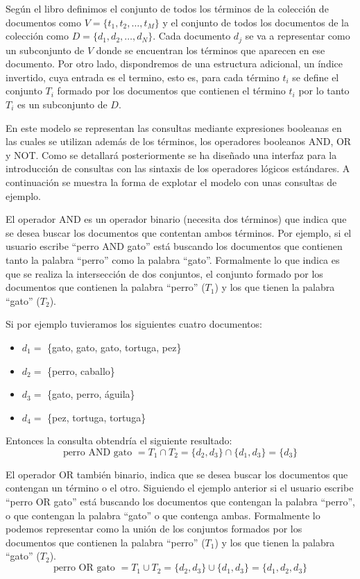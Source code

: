 \documentclass[size=a4, parskip=half, titlepage=false, toc=flat, toc=bib, 12pt, twoside]{scrartcl}
\theoremstyle{theorem-style}
\theoremstyle{definition-style}
\theoremstyle{remark-style}
\theoremstyle{example-style}
\theoremstyle{definition-style}
\theoremstyle{remark-style}
\begin{document}
Según el libro \cite{ri} definimos el conjunto de todos los términos de la colección de documentos como $V = \{t_1, t_2, \dots, t_M \}$ y el conjunto de todos los documentos de la colección como $D = \{ d_1, d_2, \dots, d_N \}$. Cada documento $d_j$ se va a representar como un subconjunto de $V$ donde se encuentran los términos que aparecen en ese documento. Por otro lado, dispondremos de una estructura adicional, un índice invertido, cuya entrada es el termino, esto es, para cada término $t_i$ se define el conjunto $T_i$ formado por los documentos que contienen el término $t_i$ por lo tanto $T_i$ es un subconjunto de $D$.

En este modelo se representan las consultas mediante expresiones booleanas en las cuales se utilizan además de los términos, los operadores booleanos AND, OR y NOT. Como se detallará posteriormente se ha diseñado una interfaz para la introducción de consultas con las sintaxis de los operadores lógicos estándares. A continuación se muestra la forma de explotar el modelo con unas consultas de ejemplo.

El operador AND es un operador binario (necesita dos términos) que indica que se desea buscar los documentos que contentan ambos términos. Por ejemplo, si el usuario escribe ``perro AND gato'' está buscando los documentos que contienen tanto la palabra ``perro'' como la palabra ``gato''. Formalmente lo que indica es que se realiza la intersección de dos conjuntos, el conjunto formado por los documentos que contienen la palabra ``perro'' ($T_1$) y los que tienen la palabra ``gato'' ($T_2$).

Si por ejemplo tuvieramos los siguientes cuatro documentos:
\begin{itemize}
\item $d_1 = $ \{gato, gato, gato, tortuga, pez\}
\item $d_2 = $ \{perro, caballo\}
\item $d_3 = $ \{gato, perro, águila\}
\item $d_4 = $ \{pez, tortuga, tortuga\}
\end{itemize}
Entonces la consulta obtendría el siguiente resultado:
$$\textrm{perro AND gato } = T_1 \cap T_2 = \{d_2, d_3\} \cap \{d_1, d_3\} = \{d_3\}$$

El operador OR también binario, indica que se desea buscar los documentos que contengan un término o el otro. Siguiendo el ejemplo anterior si el usuario escribe ``perro OR gato'' está buscando los documentos que contengan la palabra ``perro'', o que contengan la palabra ``gato'' o que contenga ambas. Formalmente lo podemos representar como la unión de los conjuntos formados por los documentos que contienen la palabra ``perro'' ($T_1$) y los que tienen la palabra ``gato'' ($T_2$).
$$\textrm{perro OR gato } = T_1 \cup T_2 = \{d_2, d_3\} \cup \{d_1, d_3\} = \{d_1, d_2, d_3\}$$
\end{document}
